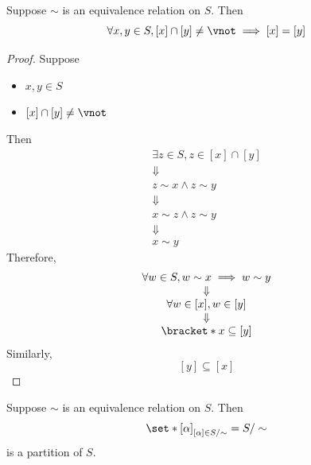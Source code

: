 \bigskip

\begin{lemma} \label{an:lem:equivalence-class-intersection}
  Suppose $\sim$ is an equivalence relation on $S$. Then
  \[
    \forall x, y \in S, [x] \cap [y] \neq \vnot \implies [x] = [y]
  \]
\end{lemma}

\begin{proof}
  Suppose
  \begin{itemize}
    \item $x, y \in S$
    \item $[x] \cap [y] \neq \vnot$
  \end{itemize}
  Then
  \[
    \begin{array}{c}
      \exists z \in S, z \in [x] \cap [y] \\
      \Downarrow                          \\
      z \sim x \land z \sim y             \\
      \Downarrow                          \\
      x \sim z \land z \sim y             \\
      \Downarrow                          \\
      x \sim y
    \end{array}
  \]
  Therefore,
  \[
    \begin{array}{c}
      \forall w \in S, w \sim x \implies w \sim y \\
      \Downarrow                                  \\
      \forall w \in [x], w \in [y]                \\
      \Downarrow                                  \\
      \bracket*{x} \subseteq [y]
    \end{array}
  \]
  Similarly,
  \[
    [y] \subseteq [x]
  \]
\end{proof}

\bigskip

\begin{theorem} \label{an:thm:equivalence-relation-defines-partition}
  Suppose $\sim$ is an equivalence relation on $S$. Then
  \[
    \set*{[\alpha]}_{[\alpha] \in S / \sim} = S / \sim
  \]
  is a partition of $S$.
\end{theorem}

